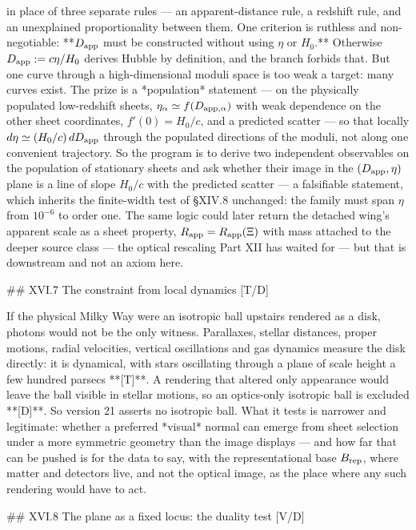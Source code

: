 in place of three separate rules — an apparent-distance rule, a redshift rule, and an unexplained proportionality between them. One criterion is ruthless and non-negotiable: **$D_{\rm app}$ must be constructed without using $\eta$ or $H_0$.** Otherwise $D_{\rm app} := c\eta/H_0$ derives Hubble by definition, and the branch forbids that. But one curve through a high-dimensional moduli space is too weak a target: many curves exist. The prize is a *population* statement — on the physically populated low-redshift sheets, $\eta_\alpha\simeq f(D_{ {\rm app},\alpha})$ with weak dependence on the other sheet coordinates, $f'(0) = H_0/c$, and a predicted scatter — so that locally $d\eta\simeq(H_0/c)\,dD_{\rm app}$ through the populated directions of the moduli, not along one convenient trajectory. So the program is to derive two independent observables on the population of stationary sheets and ask whether their image in the $(D_{\rm app},\eta)$ plane is a line of slope $H_0/c$ with the predicted scatter — a falsifiable statement, which inherits the finite-width test of §XIV.8 unchanged: the family must span $\eta$ from $10^{-6}$ to order one. The same logic could later return the detached wing's apparent scale as a sheet property, $R_{\rm app} = R_{\rm app}(\Xi)$ with mass attached to the deeper source class — the optical rescaling Part XII has waited for — but that is downstream and not an axiom here.

## XVI.7 The constraint from local dynamics [T/D]

If the physical Milky Way were an isotropic ball upstairs rendered as a disk, photons would not be the only witness. Parallaxes, stellar distances, proper motions, radial velocities, vertical oscillations and gas dynamics measure the disk directly: it is dynamical, with stars oscillating through a plane of scale height a few hundred parsecs **[T]**. A rendering that altered only appearance would leave the ball visible in stellar motions, so an optics-only isotropic ball is excluded **[D]**. So version 21 asserts no isotropic ball. What it tests is narrower and legitimate: whether a preferred *visual* normal can emerge from sheet selection under a more symmetric geometry than the image displays — and how far that can be pushed is for the data to say, with the representational base $B_{\rm rep}$, where matter and detectors live, and not the optical image, as the place where any such rendering would have to act.

## XVI.8 The plane as a fixed locus: the duality test [V/D]

